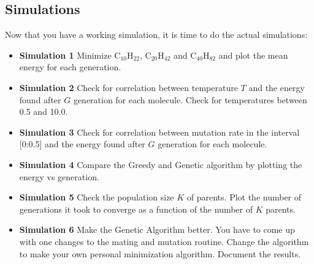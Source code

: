 \documentclass{article}
\begin{document}
\subsection{Simulations}

Now that you have a working simulation, it is time to
do the actual simulations:

\begin{itemize}
    \item {\bf Simulation 1}\newline
      Minimize
      C$_{10}$H$_{22}$,
      C$_{20}$H$_{42}$ and
      C$_{40}$H$_{82}$
      and plot the mean energy for
      each generation.

    \item {\bf Simulation 2}\newline
      Check for correlation between temperature $T$ and
      the energy found after $G$ generation for each molecule.
      Check for temperatures between 0.5 and 10.0.

    \item {\bf Simulation 3}\newline
      Check for correlation between mutation rate in the interval [0:0.5] and
      the energy found after $G$ generation for each molecule.

    \item {\bf Simulation 4}\newline
      Compare the Greedy and Genetic algorithm by
      plotting the energy vs generation.

    \item {\bf Simulation 5}\newline
      Check the population size $K$ of parents.
      Plot the number of generations it took to converge
      as a function of the number of $K$ parents.

    \item {\bf Simulation 6}\newline
      Make the Genetic Algorithm better.
      You have to come up with one changes to the mating
      and mutation routine.
      Change the algorithm to make your own personal
      minimization algorithm. Document the results.


\end{itemize}





\end{document}
